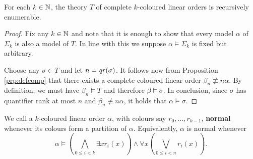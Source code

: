 \begin{prp}
	For each $k\in\mathbb{N}$, the theory $T$ of complete $k$-coloured linear orders is recursively enumerable.
\end{prp}
\begin{proof}
	Fix any $k\in\mathbb{N}$ and note that it is enough to show that every model $\alpha$ of $\Sigma_k$ is also a model of $T$.  In line with this we suppose $\alpha\models\Sigma_k$ is fixed but arbitrary.

	Choose any $\sigma\in T$ and let $n=\mathit{qr}(\sigma)$.  It follows now from Proposition \ref{prp:defcomp} that there exists a complete coloured linear order $\beta_n\nequiv{n}\alpha$.  By definition, we must have $\beta_n\models T$ and therefore $\beta\models\sigma$.  In conclusion, since $\sigma$ has quantifier rank at most $n$ and $\beta_n\nequiv{n}\alpha$, it holds that $\alpha\models\sigma$.
\end{proof}

\begin{dfn}[Normality] We call a $k$-coloured linear order $\alpha$, with colours say $r_0,\dotsc,r_{k-1}$, \textbf{normal} whenever its colours form a partition of $\alpha$.  Equivalently, $\alpha$ is normal whenever
	\begin{equation}
		\alpha\models\left(\bigwedge_{0\leq i<k}\exists xr_i(x)\right)\wedge\forall x\left(\bigvee_{0\leq i<n}r_i(x)\right).
	\end{equation}
\end{dfn}


